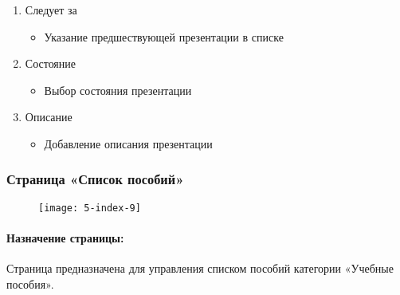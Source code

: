 \begin{enumerate}
\begin{enumerate}
\begin{enumerate}
			\item Следует за
			\begin{itemize}
				\item Указание предшествующей презентации в списке
			\end{itemize}

			\item Состояние
			\begin{itemize}
				\item Выбор состояния презентации
			\end{itemize}

			\item Описание
			\begin{itemize}
				\item Добавление описания презентации
			\end{itemize}


		\end{enumerate}
	\end{enumerate}
\end{enumerate}


\subsubsection{Страница «Список пособий»}
\begin{figure}[H]
\texttt{[image: 5-index-9]}
\end{figure}
\paragraph{Назначение страницы:} Страница предназначена для управления списком пособий категории «Учебные пособия».

